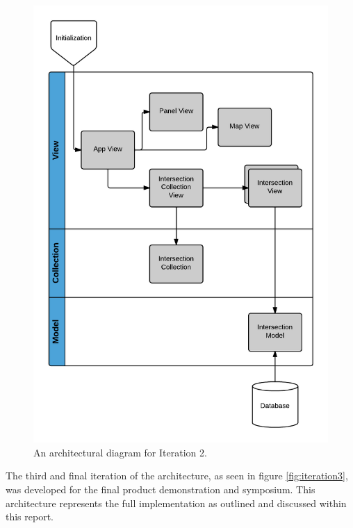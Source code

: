 \documentclass{report}
\begin{document}
\begin{figure}[htbp!]
  \begin{centering}
    \includegraphics[scale=0.25]{figures/Iteration-2.png}
    \caption{An architectural diagram for Iteration 2.}
    \label{fig:iteration2}
  \end{centering}
\end{figure}

The third and final iteration of the architecture, as seen in figure \ref{fig:iteration3}, was developed for the final product demonstration and symposium. This architecture represents the full implementation as outlined and discussed within this report.
\end{document}
